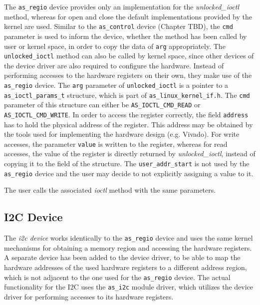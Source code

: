 The \texttt{as\_regio} device provides only an implementation for the \textit{unlocked\_ioctl} method, whereas for open and close the default implementations provided by the kernel are used.
Similar to the \texttt{as\_control} device (Chapter TBD), the \texttt{cmd} parameter is used to inform the device, whether the method has been called by user or kernel space, in order to copy the data of \texttt{arg} appropriately.
The \texttt{unlocked\_ioctl} method can also be called by kernel space, since other devices of the \asterics device driver are also required to configure the hardware.
Instead of performing accesses to the hardware registers on their own, they make use of the \texttt{as\_regio} device.
The \texttt{arg} parameter of \texttt{unlocked\_ioctl} is a pointer to a \texttt{as\_ioctl\_params\_t} structure, which is part of \texttt{as\_linux\_kernel\_if.h}.
The \texttt{cmd} parameter of this structure can either be \texttt{AS\_IOCTL\_CMD\_READ} or \texttt{AS\_IOCTL\_CMD\_WRITE}.
In order to access the register correctly, the field \texttt{address} has to hold the physical address of the register.
This address may be obtained by the tools used for implementing the hardware design (e.g. Vivado).
For write accesses, the parameter \texttt{value} is written to the register, whereas for read accesses, the value of the register is directly returned by \textit{unlocked\_ioctl}, instead of copying it to the field of the structure.
The \texttt{user\_addr\_start} is not used by the \texttt{as\_regio} device and the user may decide to not explicitly assigning a value to it.

The user calls the associated \textit{ioctl} method with the same parameters.


\subsection{I2C Device}

The \textit{i2c device} works identically to the \texttt{as\_regio} device and uses the same kernel mechanisms for obtaining a memory region and accessing the hardware registers.
A separate device has been added to the \asterics device driver, to be able to map the hardware addresses of the used hardware registers to a different address region, which is not adjacent to the one used for the \texttt{as\_regio} device.
The actual functionality for the I2C uses the \texttt{as\_i2c} module driver, which utilizes the device driver for performing accesses to its hardware registers.



